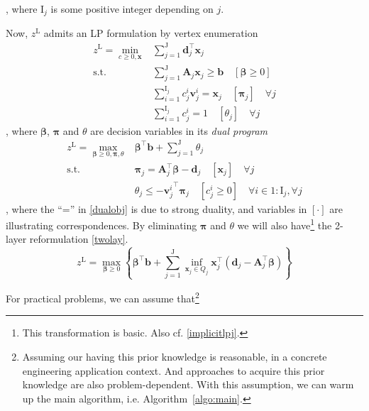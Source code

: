 \documentclass[journal]{IEEEtran}
\begin{document}
, where $\mathrm{I}_j$ is some positive integer depending on $j$.
\par
Now, $z^\mathrm{L}$ admits an LP formulation by vertex enumeration
\begin{align}\label{explicitzl}
    z^\mathrm{L} = \min_{c \geqslant 0, \mathbf{x}} & \sum_{j=1}^\mathrm{J} \mathbf{d}_j^\top \mathbf{x}_j  \\
    \text{s.t. }& \sum_{j=1}^\mathrm{J} \mathbf{A}_j \mathbf{x}_j \geqslant \mathbf{b} \quad [\boldsymbol{\beta} \geqslant 0] \\
     & \sum_{i=1}^{\mathrm{I}_j} c_j^i \mathbf{v}_j^i = \mathbf{x}_j  \quad [\boldsymbol{\pi}_j] \quad \forall j \\
     & \sum_{i=1}^{\mathrm{I}_j} c_j^i = 1 \quad [\theta_j] \quad \forall j
\end{align}
, where $\boldsymbol{\beta}$, $\boldsymbol{\pi}$ and $\theta$ are decision
variables in its \textit{dual program}
\begin{align}
    z^\mathrm{L} = \max_{\boldsymbol{\beta} \geqslant 0, \boldsymbol{\pi}, \theta} & \boldsymbol{\beta}^\top \mathbf{b} + \sum_{j=1}^\mathrm{J} \theta_j \label{dualobj} \\
    \text{s.t. } & \boldsymbol{\pi}_j = \mathbf{A}_j^\top \boldsymbol{\beta} - \mathbf{d}_j \quad [\mathbf{x}_j] \quad \forall j \label{dualpiline} \\
    & \theta_j \le -{\mathbf{v}_j^i}^\top \boldsymbol{\pi}_j \quad [c_j^i \ge 0] \quad \forall i \in 1\!:\!\mathrm{I}_j, \forall j \label{Ijjcuts}
\end{align}
, where the ``='' in \eqref{dualobj} is due to strong duality, and variables in
$[\cdot]$ are illustrating correspondences.
By eliminating $\boldsymbol{\pi}$ and $\theta$ we will also have\footnote{This transformation is basic. Also cf. \eqref{implicitlpj}.} the 2-layer reformulation \eqref{twolay}.
\begin{equation}\label{twolay}
    z^\mathrm{L} = \max_{\boldsymbol{\beta} \geqslant 0} \left\{ \boldsymbol{\beta}^\top\mathbf{b} + \sum_{j=1}^\mathrm{J} \inf_{\mathbf{x}_j \in Q_j} \mathbf{x}_j^\top (\mathbf{d}_j - \mathbf{A}_j^\top \boldsymbol{\beta}) \right\} 
\end{equation}
\par
For practical problems, we can assume that\footnote{Assuming our having this prior
knowledge is reasonable, in a concrete engineering application context.
And approaches to acquire this prior knowledge are also problem-dependent.
With this assumption, we can warm up the main algorithm, i.e. Algorithm~\ref{algo:main}.
}
\end{document}
